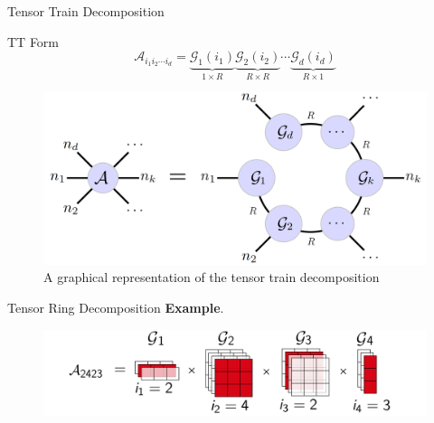 \documentclass[t, 10pt, handout, aspectratio=169]{beamer}
\begin{document}

\begin{frame}{Tensor Train Decomposition}
\large
\begin{block}{TT Form}
$$
\mathcal{A}_{i_1i_2\cdots i_d}=\underbrace{\mathcal{G}_{1}(i_1)}_{1\times R}\underbrace{\mathcal{G}_{2}(i_2)}_{R\times R}\cdots\underbrace{\mathcal{G}_{d}(i_d)}_{R\times 1}
$$
\end{block}
\normalsize
\begin{figure}
	\centering  
	\includegraphics[width=0.45\linewidth]{figs/tensor_train_arch.png} \\
	A graphical representation of the tensor train decomposition
	\label{fig:tensor_train_arch}
\end{figure}
\end{frame}

\begin{frame}{Tensor Ring Decomposition}
\textbf{Example}.
\begin{figure}
	\centering  
	\includegraphics[width=\linewidth]{figs/tt_form_example.png}
	\label{fig:tt_form_example}
\end{figure}
\end{frame}
\end{document}
